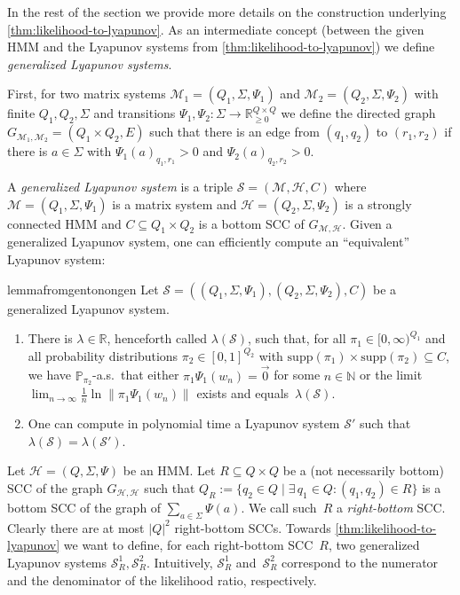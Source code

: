 \documentclass[a4paper,UKenglish,cleveref, autoref,mathscr]{lipics-v2019}
\newcommand{\RR}{\mathbb{R}}
\newcommand{\NN}{\mathbb{N}}
\newcommand{\PP}{\mathbb{P}}
\newcommand{\1}{\mathbbm{1}}
\newcommand{\supp}{\mathrm{supp}}
\renewcommand{\H}{\mathcal{H}}
\newcommand{\M}{\mathcal{M}}
\renewcommand{\S}{\mathcal{S}}
\begin{document}
In the rest of the section we provide more details on the construction underlying \cref{thm:likelihood-to-lyapunov}.
As an intermediate concept (between the given HMM and the Lyapunov systems from \cref{thm:likelihood-to-lyapunov}) we define \emph{generalized Lyapunov systems}.

First, for two matrix systems $\M_1 = (Q_1,\Sigma,\Psi_1)$ and $\M_2 = (Q_2,\Sigma,\Psi_2)$ with finite $Q_1, Q_2, \Sigma$ and transitions $\Psi_1,\Psi_2 : \Sigma \to \RR_{\ge 0}^{Q \times Q}$ we define the directed graph $G_{\M_1,\M_2} = (Q_1 \times Q_2, E)$ such that there is an edge from $(q_1,q_2)$ to $(r_1,r_2)$ if there is $a \in \Sigma$ with $\Psi_1(a)_{q_1,r_1} > 0$ and $\Psi_2(a)_{q_2,r_2} > 0$.

A \emph{generalized Lyapunov system} is a triple $\S = (\M,\H,C)$ where $\M = (Q_1, \Sigma, \Psi_1)$ is a matrix system and $\H = (Q_2, \Sigma, \Psi_2)$ is a strongly connected HMM and $C \subseteq Q_1 \times Q_2$ is a bottom SCC of $G_{\M, \H}$.
Given a generalized Lyapunov system, one can efficiently compute an ``equivalent'' Lyapunov system:
\begin{restatable}{lemma}{fromgentonongen}\label{from-gen-to-nongen}
Let $\S = ((Q_1, \Sigma, \Psi_1),(Q_2, \Sigma, \Psi_2),C)$ be a generalized Lyapunov system.
\begin{enumerate}
\item
There is $\lambda \in \RR$, henceforth called $\lambda(\S)$, such that, for all $\pi_1 \in [0,\infty)^{Q_1}$ and all probability distributions $\pi_2 \in [0,1]^{Q_2}$ with $\supp(\pi_1) \times \supp(\pi_2) \subseteq C$, we have $\PP_{\pi_2}$-a.s.\ that either $\pi_1 \Psi_1(w_n) = \vec{0}$ for some $n \in \NN$ or the limit $\lim_{n \to \infty} \frac1n \ln \| \pi_1 \Psi_1(w_n) \|$ exists and equals~$\lambda(\S)$.
\item
One can compute in polynomial time a Lyapunov system $\S'$ such that $\lambda(\S) = \lambda(\S')$.
\end{enumerate}
\end{restatable}

Let $\H = (Q,\Sigma,\Psi)$ be an HMM.
Let $R \subseteq Q \times Q$ be a (not necessarily bottom) SCC of the graph $G_{\H,\H}$ such that $Q_R := \{q_2 \in Q \mid \exists\,q_1 \in Q : (q_1,q_2) \in R\}$ is a bottom SCC of the graph of $\sum_{a \in \Sigma} \Psi(a)$.
We call such~$R$ a \emph{right-bottom} SCC.
Clearly there are at most $|Q|^2$ right-bottom SCCs.
Towards \cref{thm:likelihood-to-lyapunov} we want to define, for each right-bottom SCC~$R$, two generalized Lyapunov systems $\S_R^1, \S_R^2$.
Intuitively, $\S_R^1$ and~$\S_R^2$ correspond to the numerator and the denominator of the likelihood ratio, respectively.
\end{document}
